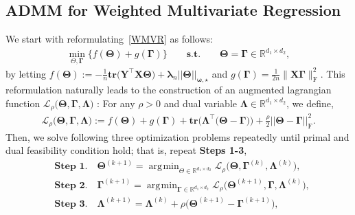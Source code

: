 \documentclass[alpha-refs]{wiley-article}
\DeclareMathOperator*{\argmin}{\arg\!\min}
\begin{document}
\subsection{ADMM for Weighted Multivariate Regression} \label{WMVR-ADMM}
We start with reformulating~\eqref{WMVR} as follows:
\begin{align} \label{reform}
    \min_{\Theta, \boldsymbol{\Gamma}} \bigg\{ f(\boldsymbol{\Theta}) + g(\boldsymbol{\Gamma}) \bigg\}
    \qquad \textbf{s.t.} \qquad \boldsymbol{\Theta} = \boldsymbol{\Gamma} \in \mathbb{R}^{d_{1}\times d_{2}},
\end{align}
by letting $f(\boldsymbol{\Theta}):=-\frac{1}{n}\textbf{tr}\big( \boldsymbol{Y}^{\top}\boldsymbol{X}\boldsymbol{\Theta} \big)+\boldsymbol{\lambda}_{n}||\boldsymbol{\Theta}||_{\boldsymbol{\omega,\star}}$ and $g(\boldsymbol{\Gamma})=\frac{1}{2n}\|\boldsymbol{X}\boldsymbol{\Gamma}\|_{\text{F}}^{2}$.
This reformulation naturally leads to the construction of an augmented lagrangian function $\mathcal{L}_{\rho}\big(\boldsymbol{\Theta},\boldsymbol{\Gamma},\boldsymbol{\Lambda}\big)$ : For any $\rho>0$ and dual variable $\boldsymbol{\Lambda} \in \mathbb{R}^{d_{1}\times d_{2}}$, we define, 
\begin{align} \label{Lagrangian}
    \mathcal{L}_{\rho}\big(\boldsymbol{\Theta},\boldsymbol{\Gamma},\boldsymbol{\Lambda}\big):=
    f(\boldsymbol{\Theta}) + g(\boldsymbol{\Gamma}) + \textbf{tr}\big( \boldsymbol{\Lambda}^{\top}\big( \boldsymbol{\Theta}-\boldsymbol{\Gamma} \big)\big)
    + \frac{\rho}{2} || \boldsymbol{\Theta}-\boldsymbol{\Gamma} ||_{\text{F}}^{2}.
\end{align}
Then, we solve following three optimization problems repeatedly until primal and dual feasibility condition hold; that is, 
repeat \textbf{Steps 1-3},
\begin{align*}
    &\textbf{Step 1.} \quad \boldsymbol{\Theta}^{(k+1)} = \argmin_{\Theta \in \mathbb{R}^{d_{1} \times d_{2}}} \mathcal{L}_{\rho} \big( \boldsymbol{\Theta},\boldsymbol{\Gamma}^{(k)},\boldsymbol{\Lambda}^{(k)} \big), \\
    &\textbf{Step 2.} \quad \boldsymbol{\Gamma}^{(k+1)} = \argmin_{\boldsymbol{\Gamma} \in \mathbb{R}^{d_{1} \times d_{2}}} \mathcal{L}_{\rho} \big( \boldsymbol{\Theta}^{(k+1)},\boldsymbol{\Gamma},\boldsymbol{\Lambda}^{(k)} \big),  \\
    &\textbf{Step 3.} \quad \boldsymbol{\Lambda}^{(k+1)} = \boldsymbol{\Lambda}^{(k)} + \rho\big( \boldsymbol{\Theta}^{(k+1)}-\boldsymbol{\Gamma}^{(k+1)} \big),
\end{align*}
\end{document}
